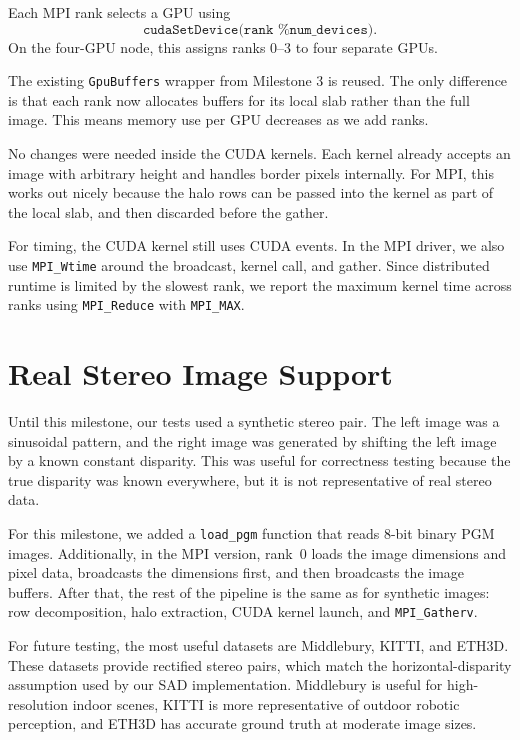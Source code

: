 \documentclass[11pt]{article}
\begin{document}
Each MPI rank selects a GPU using
\[
\texttt{cudaSetDevice(rank \% num\_devices)}.
\]
On the four-GPU node, this assigns ranks 0--3 to four separate GPUs.

The existing \texttt{GpuBuffers} wrapper from Milestone 3 is reused. The only
difference is that each rank now allocates buffers for its local slab rather than the
full image. This means memory use per GPU decreases as we add ranks.

No changes were needed inside the CUDA kernels. Each kernel already accepts an image
with arbitrary height and handles border pixels internally. For MPI, this works out
nicely because the halo rows can be passed into the kernel as part of the local slab,
and then discarded before the gather.

For timing, the CUDA kernel still uses CUDA events. In the MPI driver, we also use
\texttt{MPI\_Wtime} around the broadcast, kernel call, and gather. Since distributed
runtime is limited by the slowest rank, we report the maximum kernel time across ranks
using \texttt{MPI\_Reduce} with \texttt{MPI\_MAX}.

\section{Real Stereo Image Support}
\label{sec:realimages}

Until this milestone, our tests used a synthetic stereo pair. The left image was a
sinusoidal pattern, and the right image was generated by shifting the left image by a
known constant disparity. This was useful for correctness testing because the true
disparity was known everywhere, but it is not representative of real stereo data.

For this milestone, we added a \texttt{load\_pgm} function that reads 8-bit binary PGM images. Additionally, in the MPI version, rank~0 loads the image dimensions and pixel data, broadcasts the
dimensions first, and then broadcasts the image buffers. After that, the rest of the
pipeline is the same as for synthetic images: row decomposition, halo extraction,
CUDA kernel launch, and \texttt{MPI\_Gatherv}.

For future testing, the most useful datasets are Middlebury, KITTI, and ETH3D. These
datasets provide rectified stereo pairs, which match the horizontal-disparity
assumption used by our SAD implementation. Middlebury is useful for high-resolution
indoor scenes, KITTI is more representative of outdoor robotic perception, and ETH3D
has accurate ground truth at moderate image sizes.
\end{document}
